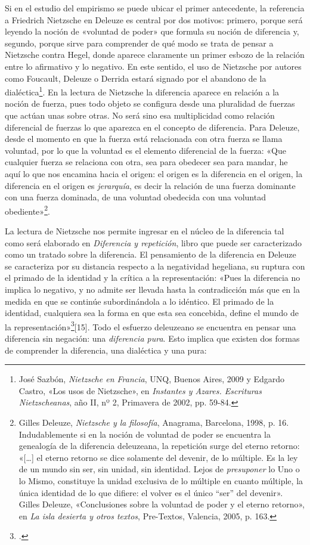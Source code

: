 Si en el estudio del empirismo se puede ubicar el primer antecedente, la referencia a Friedrich Nietzsche en Deleuze es central por dos motivos: primero, porque será leyendo la noción de «voluntad de poder» que formula su noción de diferencia y, segundo, porque sirve para comprender de qué modo se trata de pensar a Nietzsche contra Hegel, donde aparece claramente un primer esbozo de la relación entre lo afirmativo y lo negativo. En este sentido, el uso de Nietzsche por autores como Foucault, Deleuze o Derrida estará signado por el abandono de la dialéctica\footnote{José Sazbón, \emph{Nietzsche en Francia}, UNQ, Buenos Aires, 2009 y Edgardo Castro, «Los usos de Nietzsche», en \emph{Instantes y Azares. Escrituras Nietzscheanas}, año II, nº 2, Primavera de 2002, pp. 59-84.}. En la lectura de Nietzsche la diferencia aparece en relación a la noción de fuerza, pues todo objeto se configura desde una pluralidad de fuerzas que actúan unas sobre otras. No será sino esa multiplicidad como relación diferencial de fuerzas lo que aparezca en el concepto de diferencia. Para Deleuze, desde el momento en que la fuerza está relacionada con otra fuerza se llama voluntad, por lo que la voluntad es el elemento diferencial de la fuerza: «Que cualquier fuerza se relaciona con otra, sea para obedecer sea para mandar, he aquí lo que nos encamina hacia el origen: el origen es la diferencia en el origen, la diferencia en el origen es \emph{jerarquía}, es decir la relación de una fuerza dominante con una fuerza dominada, de una voluntad obedecida con una voluntad obediente»\footnote{Gilles Deleuze, \emph{Nietzsche y la filosofía}, Anagrama, Barcelona, 1998, p. 16. Indudablemente si en la noción de voluntad de poder se encuentra la genealogía de la diferencia deleuzeana, la repetición surge del eterno retorno: «{[}\ldots{]} el eterno retorno se dice solamente del devenir, de lo múltiple. Es la ley de un mundo sin ser, sin unidad, sin identidad. Lejos de \emph{presuponer} lo Uno o lo Mismo, constituye la unidad exclusiva de lo múltiple en cuanto múltiple, la única identidad de lo que difiere: el volver es el único ``ser'' del devenir». Gilles Deleuze, «Conclusiones sobre la voluntad de poder y el eterno retorno», en \emph{La isla desierta y otros textos}, Pre-Textos, Valencia, 2005, p. 163.}.

La lectura de Nietzsche nos permite ingresar en el núcleo de la diferencia tal como será elaborado en \emph{Diferencia y repetición}, libro que puede ser caracterizado como un tratado sobre la diferencia. El pensamiento de la diferencia en Deleuze se caracteriza por su distancia respecto a la negatividad hegeliana, su ruptura con el primado de la identidad y la crítica a la representación: «Pues la diferencia no implica lo negativo, y no admite ser llevada hasta la contradicción más que en la medida en que se continúe subordinándola a lo idéntico. El primado de la identidad, cualquiera sea la forma en que esta sea concebida, define el mundo de la representación»\footcite{@6961-DELEUZE2002}[15]. Todo el esfuerzo deleuzeano se encuentra en pensar una diferencia sin negación: una \emph{diferencia pura}. Esto implica que existen dos formas de comprender la diferencia, una dialéctica y una pura:

